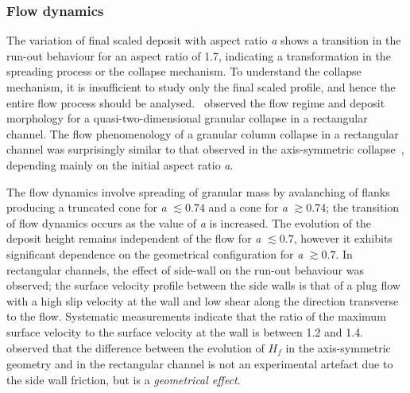 \subsubsection{Flow dynamics}
The variation of final scaled deposit with aspect ratio \textit{a} shows a 
transition in the run-out behaviour for an aspect ratio of 1.7, indicating a 
transformation in the spreading process or the collapse mechanism. To 
understand the collapse mechanism, it is insufficient to study only the final 
scaled profile, and hence the entire flow process should be 
analysed.~\citet{Lajeunesse2005} observed the flow regime and deposit 
morphology for a quasi-two-dimensional granular collapse in a rectangular 
channel. The flow phenomenology of a granular column collapse in a rectangular 
channel was surprisingly similar to that observed in the axis-symmetric 
collapse~\citep{Lube2005,Lajeunesse2004}, depending mainly on the initial 
aspect ratio \textit{a}. 

The flow dynamics involve spreading of granular mass 
by avalanching of flanks producing a truncated cone for \textit{a} $\lesssim 
0.74$ and a cone for \textit{a} $\gtrsim 0.74$; the transition of flow dynamics 
occurs as the value of \textit{a} is increased. The evolution of the deposit 
height remains independent of the flow for \textit{a} $\lesssim 0.7$, however 
it exhibits significant dependence on the geometrical configuration for 
\textit{a} $\gtrsim 0.7$. In rectangular channels, the effect of side-wall on 
the run-out behaviour was observed; the surface velocity profile between the 
side walls is that of a plug flow with a high slip velocity at the wall and low 
shear along the direction transverse to the flow. Systematic measurements 
indicate that the ratio of the maximum surface velocity to the surface velocity 
at the wall is between 1.2 and 1.4.~\citet{Lajeunesse2005} observed that the 
difference between the evolution of $\textit{H}_{\textit{f}}$ in the 
axis-symmetric geometry and in the rectangular channel is not an experimental 
artefact due to the side wall friction, but is a \textit{geometrical effect}. 



